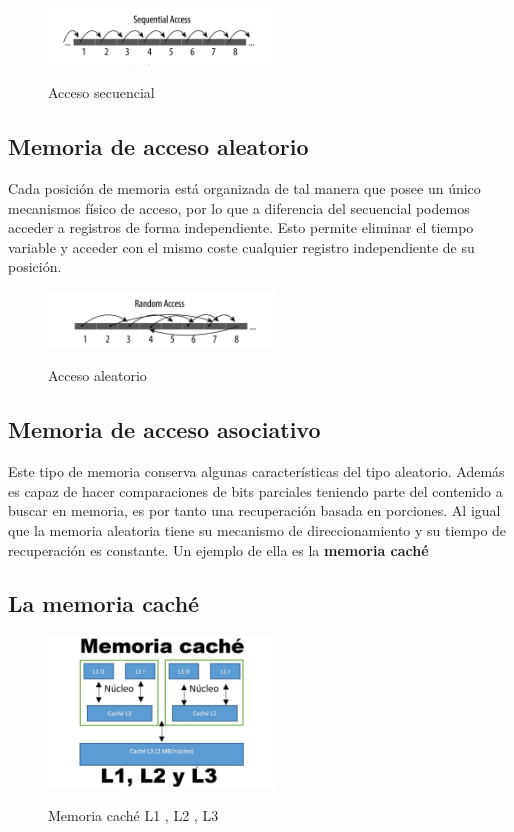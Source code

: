 \documentclass{article}
\begin{document}
    \begin{figure}[h]
    \includegraphics[width=6cm]{images/secuencial.png}
    \centering
    \label{fig:noaleatory}
    \caption{Acceso secuencial}
    \end{figure}

\subsection{Memoria de acceso aleatorio} Cada posición de memoria está organizada de tal manera que posee un único mecanismos físico de acceso, por lo que a diferencia del secuencial podemos acceder a registros de forma independiente. Esto permite eliminar el tiempo variable y acceder con el mismo coste cualquier registro independiente de su posición.

    \begin{figure}[h]
    \includegraphics[width=6cm]{images/aleatorio.png}
    \centering
    \label{fig:aleatory}
    \caption{Acceso aleatorio}
    \end{figure}

\subsection{Memoria de acceso asociativo}
Este tipo de memoria conserva algunas características del tipo aleatorio. Además es capaz de hacer comparaciones de bits parciales teniendo parte del contenido a buscar en memoria, es por tanto una recuperación basada en porciones. Al igual que la memoria aleatoria tiene su mecanismo de direccionamiento y su tiempo de recuperación es constante.
Un ejemplo de ella es la \textbf{memoria caché}

\subsection{La memoria caché}
    \begin{figure}[h]
    \includegraphics[width=6cm]{images/cache.jpg}
    \centering
    \label{fig:cache}
    \caption{Memoria caché L1 , L2 , L3}
    \end{figure}
\end{document}
